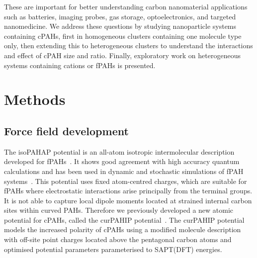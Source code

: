 These are important for better understanding carbon nanomaterial applications such as batteries, imaging probes, gas storage, optoelectronics, and targeted nanomedicine.
We address these questions by studying nanoparticle systems containing cPAHs, first in homogeneous clusters containing one molecule type only, then extending this to heterogeneous clusters to understand the interactions and effect of cPAH size and ratio. Finally, exploratory work on heterogeneous systems containing cations or fPAHs is presented. %



\section{Methods}
\subsection{Force field development}
The isoPAHAP potential is an all-atom isotropic intermolecular description developed for fPAHs~\cite{totton2010first}. It shows good agreement with high accuracy quantum calculations and has been used in dynamic and stochastic simulations of fPAH systems~\cite{Totton2012quantitative,bowal2019sphere,Grancic2016,Pascazio2017}. This potential uses fixed atom-centred charges, which are suitable for fPAHs where electrostatic interactions arise principally from the terminal groups. It is not able to capture local dipole moments located at strained internal carbon sites within curved PAHs. Therefore we previously developed a new atomic potential for cPAHs, called the curPAHIP potential~\cite{bowal2019ion}. The curPAHIP potential models the increased polarity of cPAHs using a modified molecule description with off-site point charges located above the pentagonal carbon atoms and optimised potential parameters parameterised to SAPT(DFT) energies.

